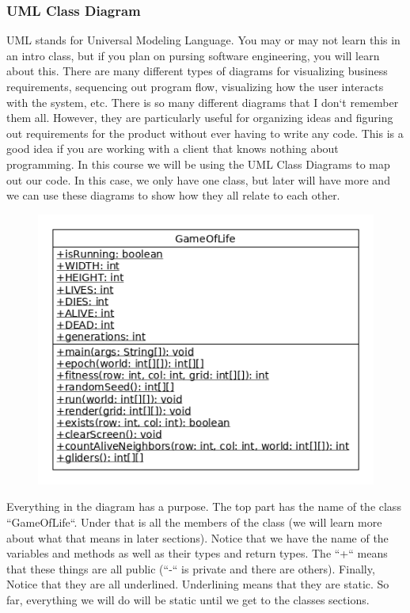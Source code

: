 \documentclass[11]{article}
\begin{document}
\subsubsection{UML Class Diagram}
UML stands for Universal Modeling Language. You may or may not learn this in an intro class, but if you plan on pursing software engineering, you will learn about this. There are many different types of diagrams for visualizing business requirements, sequencing out program flow, visualizing how the user interacts with the system, etc.  There is so many different diagrams that I don`t remember them all. However, they are particularly useful for organizing ideas and figuring out requirements for the product without ever having to write any code. This is a good idea if you are working with a client that knows nothing about programming. In this course we will be using the UML Class Diagrams to map out our code. In this case, we only have one class, but later will have more and we can use these diagrams to show how they all relate to each other.\\

\begin{figure}[H]
	\centering
	\includegraphics[scale=0.75]{classDiagram.png}
\end{figure}

Everything in the diagram has a purpose. The top part has the name of the class ``GameOfLife``. Under that is all the members of the class (we will learn more about what that means in later sections). Notice that we have the name of the variables and methods as well as their types and return types. The ``+`` means that these things are all public (``-`` is private and there are others). Finally, Notice that they are all underlined. Underlining means that they are static. So far, everything we will do will be static until we get to the classes sections.\\
\end{document}
